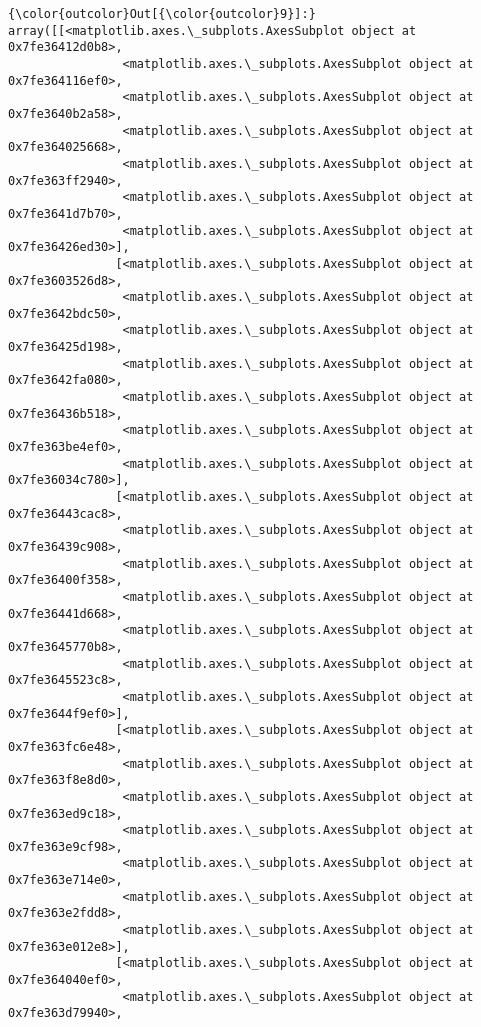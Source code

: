 \documentclass[11pt]{article}
\begin{document}
\begin{Verbatim}[commandchars=\\\{\}]
{\color{outcolor}Out[{\color{outcolor}9}]:} array([[<matplotlib.axes.\_subplots.AxesSubplot object at 0x7fe36412d0b8>,
                <matplotlib.axes.\_subplots.AxesSubplot object at 0x7fe364116ef0>,
                <matplotlib.axes.\_subplots.AxesSubplot object at 0x7fe3640b2a58>,
                <matplotlib.axes.\_subplots.AxesSubplot object at 0x7fe364025668>,
                <matplotlib.axes.\_subplots.AxesSubplot object at 0x7fe363ff2940>,
                <matplotlib.axes.\_subplots.AxesSubplot object at 0x7fe3641d7b70>,
                <matplotlib.axes.\_subplots.AxesSubplot object at 0x7fe36426ed30>],
               [<matplotlib.axes.\_subplots.AxesSubplot object at 0x7fe3603526d8>,
                <matplotlib.axes.\_subplots.AxesSubplot object at 0x7fe3642bdc50>,
                <matplotlib.axes.\_subplots.AxesSubplot object at 0x7fe36425d198>,
                <matplotlib.axes.\_subplots.AxesSubplot object at 0x7fe3642fa080>,
                <matplotlib.axes.\_subplots.AxesSubplot object at 0x7fe36436b518>,
                <matplotlib.axes.\_subplots.AxesSubplot object at 0x7fe363be4ef0>,
                <matplotlib.axes.\_subplots.AxesSubplot object at 0x7fe36034c780>],
               [<matplotlib.axes.\_subplots.AxesSubplot object at 0x7fe36443cac8>,
                <matplotlib.axes.\_subplots.AxesSubplot object at 0x7fe36439c908>,
                <matplotlib.axes.\_subplots.AxesSubplot object at 0x7fe36400f358>,
                <matplotlib.axes.\_subplots.AxesSubplot object at 0x7fe36441d668>,
                <matplotlib.axes.\_subplots.AxesSubplot object at 0x7fe3645770b8>,
                <matplotlib.axes.\_subplots.AxesSubplot object at 0x7fe3645523c8>,
                <matplotlib.axes.\_subplots.AxesSubplot object at 0x7fe3644f9ef0>],
               [<matplotlib.axes.\_subplots.AxesSubplot object at 0x7fe363fc6e48>,
                <matplotlib.axes.\_subplots.AxesSubplot object at 0x7fe363f8e8d0>,
                <matplotlib.axes.\_subplots.AxesSubplot object at 0x7fe363ed9c18>,
                <matplotlib.axes.\_subplots.AxesSubplot object at 0x7fe363e9cf98>,
                <matplotlib.axes.\_subplots.AxesSubplot object at 0x7fe363e714e0>,
                <matplotlib.axes.\_subplots.AxesSubplot object at 0x7fe363e2fdd8>,
                <matplotlib.axes.\_subplots.AxesSubplot object at 0x7fe363e012e8>],
               [<matplotlib.axes.\_subplots.AxesSubplot object at 0x7fe364040ef0>,
                <matplotlib.axes.\_subplots.AxesSubplot object at 0x7fe363d79940>,

\end{Verbatim}
\end{document}

